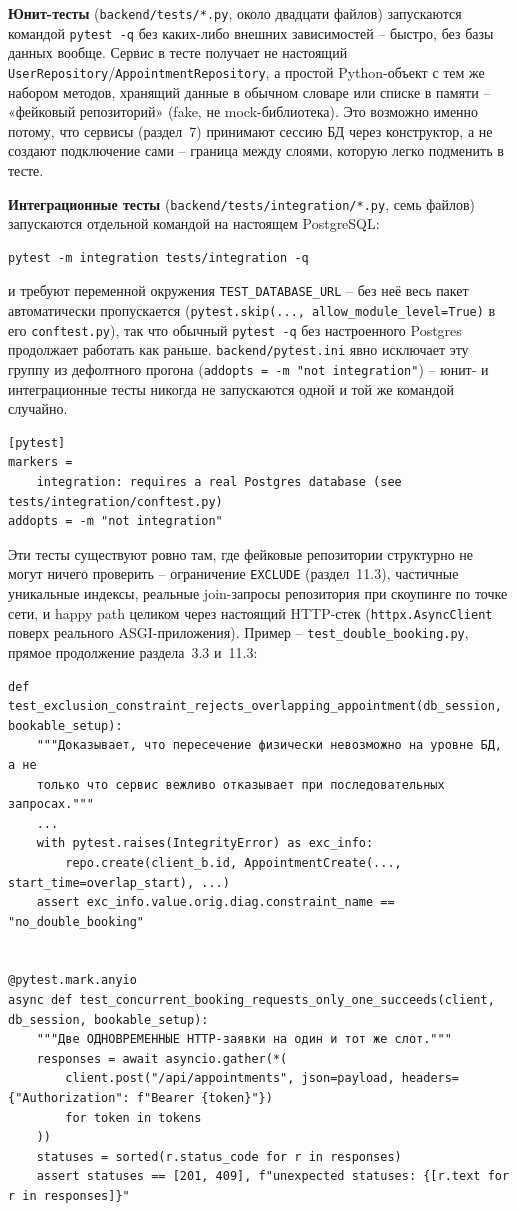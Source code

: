 \textbf{Юнит-тесты} (\texttt{backend/tests/*.py}, около двадцати файлов)
запускаются командой \texttt{pytest -q} без каких-либо внешних
зависимостей -- быстро, без базы данных вообще. Сервис в тесте получает
не настоящий \texttt{UserRepository}/\texttt{AppointmentRepository}, а
простой Python-объект с тем же набором методов, хранящий данные в
обычном словаре или списке в памяти -- «фейковый репозиторий»
(fake, не mock-библиотека). Это возможно именно потому, что сервисы
(раздел~7) принимают сессию БД через конструктор, а не создают
подключение сами -- граница между слоями, которую легко подменить в
тесте.

\textbf{Интеграционные тесты} (\texttt{backend/tests/integration/*.py},
семь файлов) запускаются отдельной командой на настоящем PostgreSQL:
\begin{verbatim}
pytest -m integration tests/integration -q
\end{verbatim}
и требуют переменной окружения \texttt{TEST_DATABASE_URL} -- без неё
весь пакет автоматически пропускается (\texttt{pytest.skip(...,
allow_module_level=True)} в его \texttt{conftest.py}), так что обычный
\texttt{pytest -q} без настроенного Postgres продолжает работать как
раньше. \texttt{backend/pytest.ini} явно исключает эту группу из
дефолтного прогона (\texttt{addopts = -m "not integration"}) -- юнит- и
интеграционные тесты никогда не запускаются одной и той же командой
случайно.

\begin{verbatim}
[pytest]
markers =
    integration: requires a real Postgres database (see tests/integration/conftest.py)
addopts = -m "not integration"
\end{verbatim}

Эти тесты существуют ровно там, где фейковые репозитории структурно не
могут ничего проверить -- ограничение \texttt{EXCLUDE} (раздел~11.3),
частичные уникальные индексы, реальные join-запросы репозитория при
скоупинге по точке сети, и happy path целиком через настоящий HTTP-стек
(\texttt{httpx.AsyncClient} поверх реального ASGI-приложения). Пример --
\texttt{test_double_booking.py}, прямое продолжение раздела~3.3 и~11.3:

\begin{verbatim}
def test_exclusion_constraint_rejects_overlapping_appointment(db_session, bookable_setup):
    """Доказывает, что пересечение физически невозможно на уровне БД, а не
    только что сервис вежливо отказывает при последовательных запросах."""
    ...
    with pytest.raises(IntegrityError) as exc_info:
        repo.create(client_b.id, AppointmentCreate(..., start_time=overlap_start), ...)
    assert exc_info.value.orig.diag.constraint_name == "no_double_booking"


@pytest.mark.anyio
async def test_concurrent_booking_requests_only_one_succeeds(client, db_session, bookable_setup):
    """Две ОДНОВРЕМЕННЫЕ HTTP-заявки на один и тот же слот."""
    responses = await asyncio.gather(*(
        client.post("/api/appointments", json=payload, headers={"Authorization": f"Bearer {token}"})
        for token in tokens
    ))
    statuses = sorted(r.status_code for r in responses)
    assert statuses == [201, 409], f"unexpected statuses: {[r.text for r in responses]}"
\end{verbatim}

